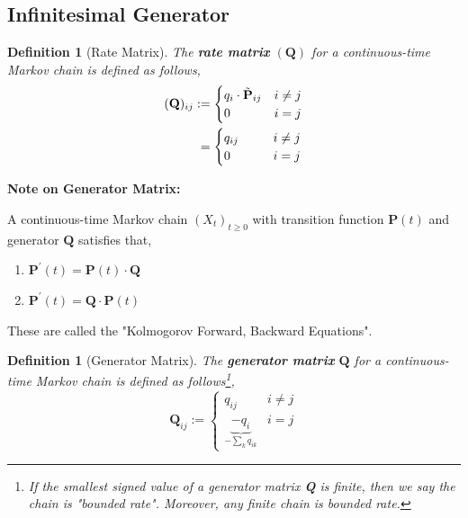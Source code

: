 \documentclass{tufte-handout}
\newtheorem{defn}[thm]{Definition}
\begin{document}
\subsection{Infinitesimal Generator}
\begin{defn}[Rate Matrix]
  The \textbf{rate matrix} $(\mathbf{Q})$ for a continuous-time Markov chain is defined as follows,
  \begin{align*}
    (\mathbf{Q})_{ij} &:= \begin{cases}
                        q_{i} \cdot \tilde{\mathbf{P}}_{ij} & i \neq j \\
                        0 & i = j
                      \end{cases} \\
                      &\hphantom{:}= \begin{cases}
                        q_{ij} \hphantom{ \cdot \tilde{\mathbf{P}}_{ij}} & i \neq j \\
                        0 & i = j
                      \end{cases}
  \end{align*}
\end{defn}

\begin{marginfigure}
  \textbf{Note on Generator Matrix:}

  \noindent A continuous-time Markov chain $(X_t)_{t \geq 0}$ with transition function $\mathbf{P}(t)$ and generator $\mathbf{Q}$ satisfies that,
  \begin{enumerate}
    \item $\mathbf{P}^{\prime}(t) = \mathbf{P}(t) \cdot \mathbf{Q}$
    \item $\mathbf{P}^{\prime}(t) = \mathbf{Q} \cdot \mathbf{P}(t)$
  \end{enumerate}
  \noindent These are called the "Kolmogorov Forward, Backward Equations".
\end{marginfigure}

\begin{defn}[Generator Matrix]
  The \textbf{generator matrix} $\mathbf{Q}$ for a continuous-time Markov chain is defined as follows\footnote{If the smallest signed value of a generator matrix \textbf{Q} is finite, then we say the chain is "bounded rate". Moreover, any finite chain is bounded rate.},
  \[
  \mathbf{Q}_{ij} := \begin{cases}
    q_{ij} & i \neq j \\
    \underbrace{-q_i}_{- \sum_{k} q_{ik}} & i = j
  \end{cases}
  \]
\end{defn}
\end{document}
